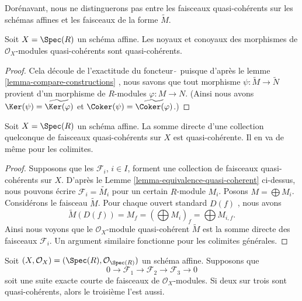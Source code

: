 \noindent
Dorénavant, nous ne distinguerons pas entre les faisceaux quasi-cohérents sur les
schémas affines et les faisceaux de la forme  $\widetilde M$.

\begin{lemma}
\label{lemma-kernel-cokernel-quasi-coherent}
Soit  $X = \Spec(R)$  un schéma affine. Les noyaux et conoyaux des morphismes de
 $\mathcal{O}_X$-modules quasi-cohérents sont quasi-cohérents.
\end{lemma}

\begin{proof}
Cela découle de l'exactitude du foncteur  $\widetilde{\ }$  puisque d'après le lemme
 \ref{lemma-compare-constructions} , nous savons que tout morphisme  $\psi : \widetilde{M} \to \widetilde{N}$  provient d'un morphisme
de  $R$-modules  $\varphi : M \to N$. (Ainsi nous avons  $\Ker(\psi) = \widetilde{\Ker(\varphi)}$  et
 $\Coker(\psi) = \widetilde{\Coker(\varphi)}$.)
\end{proof}

\begin{lemma}
\label{lemma-colimit-quasi-coherent}
Soit  $X = \Spec(R)$  un schéma affine. La somme directe d'une collection quelconque
de faisceaux quasi-cohérents sur  $X$  est quasi-cohérente. Il en va de
même pour les colimites.
\end{lemma}

\begin{proof}
Supposons que les  $\mathcal{F}_i$,  $i \in I$,  forment une collection de faisceaux
quasi-cohérents sur  $X$. D'après le Lemme  \ref{lemma-equivalence-quasi-coherent}  ci-dessus, nous
pouvons écrire  $\mathcal{F}_i = \widetilde{M_i}$  pour un certain  $R$-module  $M_i$.
Posons  $M = \bigoplus M_i$. Considérons le faisceau  $\widetilde{M}$. Pour chaque ouvert
standard  $D(f)$ , nous avons
$$
\widetilde{M}(D(f)) = M_f =
\left(\bigoplus M_i\right)_f =
\bigoplus M_{i, f}.
$$
Ainsi nous voyons que le  $\mathcal{O}_X$-module quasi-cohérent  $\widetilde{M}$  est la
somme directe des faisceaux  $\mathcal{F}_i$. Un argument similaire fonctionne pour
les colimites générales.
\end{proof}

\begin{lemma}
\label{lemma-extension-quasi-coherent}
Soit  $(X, \mathcal{O}_X) = (\Spec(R), \mathcal{O}_{\Spec(R)})$  un schéma affine. Supposons que
$$
0 \to
\mathcal{F}_1 \to
\mathcal{F}_2 \to
\mathcal{F}_3 \to
0
$$
soit une suite exacte courte de faisceaux de  $\mathcal{O}_X$-modules. Si deux sur
trois sont quasi-cohérents, alors le troisième l'est aussi.
\end{lemma}

